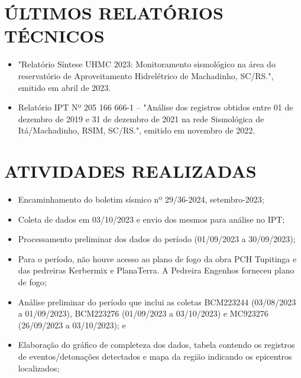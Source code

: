 \pagestyle{geral}
\section{ÚLTIMOS RELATÓRIOS TÉCNICOS}
\label{sec:ultimos_relatorios}
\begin{itemize}
	\item "Relatório Síntese UHMC 2023: Monitoramento sismológico na área do reservatório de Aproveitamento Hidrelétrico de Machadinho, SC/RS.", emitido em abril de 2023. 
    \item Relatório IPT Nº 205 166 666-1 -- "Análise dos registros obtidos entre 01 de dezembro de 2019 e 31 de dezembro de 2021 na rede Sismológica de Itá/Machadinho, RSIM, SC/RS.", emitido em novembro de 2022.  
\end{itemize}

\section{ATIVIDADES REALIZADAS}
\label{sec:atividade}
\begin{itemize}
    \item Encaminhamento do boletim sísmico nº 29/36-2024, setembro-2023;
    \item Coleta de dados em 03/10/2023 e envio dos mesmos para análise no IPT;
    \item Processamento preliminar dos dados do período (01/09/2023 a 30/09/2023);
    \item Para o período, não houve acesso ao plano de fogo da obra PCH Tupitinga e das pedreiras Kerbermix e PlanaTerra. A Pedreira Engenhos forneceu plano de fogo;
    \item Análise preliminar do período que inclui as coletas BCM223244 (03/08/2023 a 01/09/2023), BCM223276 (01/09/2023 a 03/10/2023) e MC923276 (26/09/2023 a 03/10/2023); e   
    \item Elaboração do gráfico de completeza dos dados, tabela contendo os registros de eventos/detonações detectados e mapa da região indicando os epicentros localizados;
\end{itemize}

